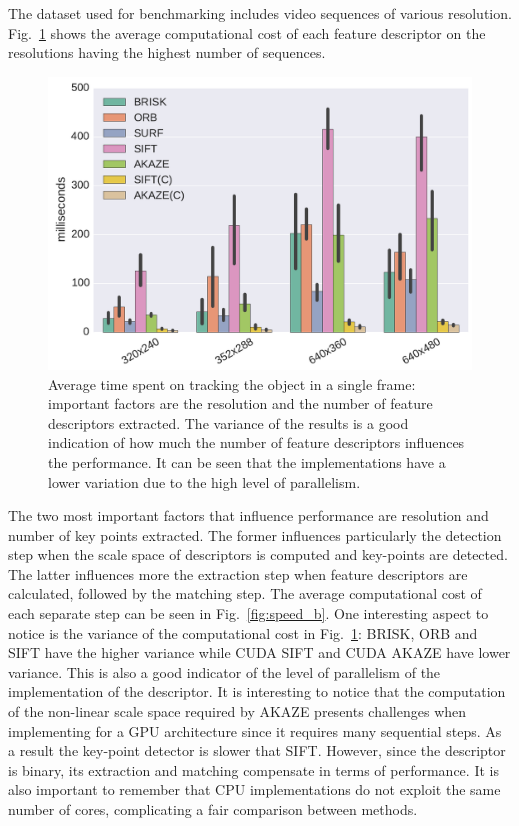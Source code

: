 The dataset used for benchmarking includes video sequences of various resolution. Fig.~\ref{fig:speed} shows the average computational cost of each feature descriptor on the resolutions having the highest number of sequences. 

\begin{figure}[!htb]
	\includegraphics[width=0.95\linewidth]{imgs/tracker_fps_std.pdf}
\vspace{-2.5mm}	
\caption{Average time spent on tracking the object in a single frame: important factors are the resolution and the number of feature descriptors extracted. The variance of the results is a good indication of how much the number of feature descriptors influences the performance. It can be seen that the implementations have a lower variation due to the high level of parallelism. }
\vspace{-3mm}
\label{fig:speed}
\end{figure}

The two most important factors that influence performance are resolution and number of key points extracted. The former influences particularly the detection step when the scale space of descriptors is computed and key-points are detected. The latter influences more the extraction step when feature descriptors are calculated, followed by the matching step. The average computational cost of each separate step can be seen in Fig.~\ref{fig:speed_b}. One interesting aspect to notice is the variance of the computational cost in Fig.~\ref{fig:speed}: BRISK, ORB and SIFT have the higher variance while CUDA SIFT and CUDA AKAZE have lower variance. This is also a good indicator of the level of parallelism of the implementation of the descriptor. It is interesting to notice that the computation of the non-linear scale space required by AKAZE presents challenges when implementing for a GPU architecture since it requires many sequential steps. As a result the key-point detector is slower that SIFT. However, since the descriptor is binary, its extraction and matching compensate in terms of performance. It is also important to remember that CPU implementations do not exploit the same number of cores, complicating a fair comparison between methods.

